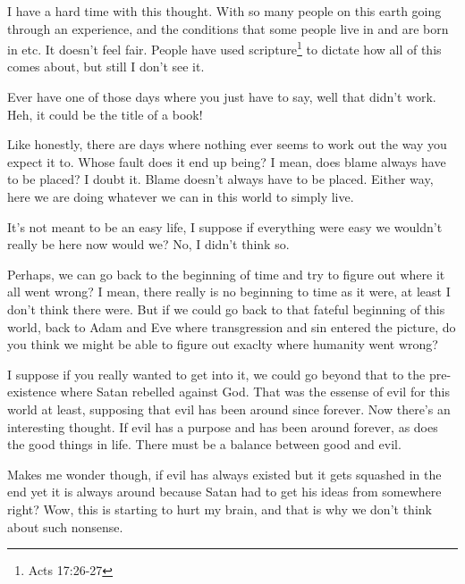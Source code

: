 I have a hard time with this thought. With so many people on this earth going through
an experience, and the conditions that some people live in and are born in etc. It
doesn't feel fair. People have used scripture\footnote{Acts 17:26-27} to dictate how 
all of this comes about, but still I don't see it.

Ever have one of those days where you just have to say, well that didn't work. Heh,
it could be the title of a book!

Like honestly, there are days where nothing ever seems to work out the way you expect
it to. Whose fault does it end up being? I mean, does blame always have to be placed?
I doubt it. Blame doesn't always have to be placed. Either way, here we are doing
whatever we can in this world to simply live.

It's not meant to be an easy life, I suppose if everything were easy we wouldn't
really be here now would we? No, I didn't think so.

Perhaps, we can go back to the beginning of time and try to figure out where it all
went wrong? I mean, there really is no beginning to time as it were, at least I don't
think there were. But if we could go back to that fateful beginning of this world,
back to Adam and Eve where transgression and sin entered the picture, do you think we
might be able to figure out exaclty where humanity went wrong?

I suppose if you really wanted to get into it, we could go beyond that to the
pre-existence where Satan rebelled against God. That was the essense of evil for this
world at least, supposing that evil has been around since forever. Now there's an
interesting thought. If evil has a purpose and has been around forever, as does the
good things in life. There must be a balance between good and evil.

Makes me wonder though, if evil has always existed but it gets squashed in the end
yet it is always around because Satan had to get his ideas from somewhere right? Wow,
this is starting to hurt my brain, and that is why we don't think about such
nonsense.
